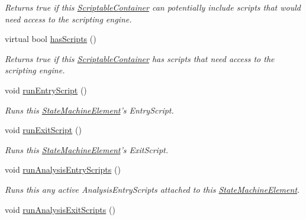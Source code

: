 \begin{DoxyCompactItemize}
\begin{DoxyCompactList}\small\item\em Returns true if this \hyperlink{class_picto_1_1_scriptable_container}{Scriptable\-Container} can potentially include scripts that would need access to the scripting engine. \end{DoxyCompactList}\item 
virtual bool \hyperlink{class_picto_1_1_state_machine_element_ab93cc37be3b570575b812e13ec4f806a}{has\-Scripts} ()
\begin{DoxyCompactList}\small\item\em Returns true if this \hyperlink{class_picto_1_1_scriptable_container}{Scriptable\-Container} has scripts that need access to the scripting engine. \end{DoxyCompactList}\item 
void \hyperlink{class_picto_1_1_state_machine_element_a3164fcfab6f811ceed7b008c20533975}{run\-Entry\-Script} ()
\begin{DoxyCompactList}\small\item\em Runs this \hyperlink{class_picto_1_1_state_machine_element}{State\-Machine\-Element}'s Entry\-Script. \end{DoxyCompactList}\item 
void \hyperlink{class_picto_1_1_state_machine_element_ad8efd27231553c08e289a3a81cce0f4c}{run\-Exit\-Script} ()
\begin{DoxyCompactList}\small\item\em Runs this \hyperlink{class_picto_1_1_state_machine_element}{State\-Machine\-Element}'s Exit\-Script. \end{DoxyCompactList}\item 
\hypertarget{class_picto_1_1_state_machine_element_a6f9987feb3fad2565c362496fb82cb77}{void \hyperlink{class_picto_1_1_state_machine_element_a6f9987feb3fad2565c362496fb82cb77}{run\-Analysis\-Entry\-Scripts} ()}\label{class_picto_1_1_state_machine_element_a6f9987feb3fad2565c362496fb82cb77}

\begin{DoxyCompactList}\small\item\em Runs this any active Analysis\-Entry\-Scripts attached to this \hyperlink{class_picto_1_1_state_machine_element}{State\-Machine\-Element}. \end{DoxyCompactList}\item 
\hypertarget{class_picto_1_1_state_machine_element_a6659591de195b38ed9b39065f38df690}{void \hyperlink{class_picto_1_1_state_machine_element_a6659591de195b38ed9b39065f38df690}{run\-Analysis\-Exit\-Scripts} ()}\label{class_picto_1_1_state_machine_element_a6659591de195b38ed9b39065f38df690}


\end{DoxyCompactItemize}
